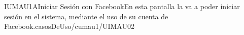 
\begin{IU}{IUMAU1A}{Iniciar Sesión con Facebook}{En esta pantalla la  va a poder iniciar sesión en el sistema, mediante el uso de su cuenta de Facebook.}{casosDeUso/cumau1/UIMAU02}
\end{IU}